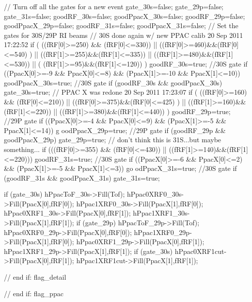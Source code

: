 \begin{DoxyCode}
{{{{{{{{{{          // Turn off all the gates for a new event
          gate_30s=false;
          gate_29p=false;
          gate_31s=false;
          goodRF_30s=false;
          goodPpacX_30s=false;
          goodRF_29p=false;
          goodPpacX_29p=false;
          goodRF_31s=false;
          goodPpacX_31s=false;
          // Set the gates for 30S/29P RI beams
          // 30S done again w/ new PPAC calib 20 Sep 2011 17:22:52  
          if (  ((fRF[0]>=250) && (fRF[0]<=330)) || ((fRF[0]>=460)&&(fRF[0]<=540)
      ) ||
            ((fRF[1]>=255)&&(fRF[1]<=335)) || ((fRF[1]>=480)&&(fRF[1]<=530)) || (
      (fRF[1]>=95)&&(fRF[1]<=120))
            ) {goodRF_30s=true;} //30S gate
          if ((PpacX[0]>=-9 && PpacX[0]<=8) && (PpacX[1]>=-10 && PpacX[1]<=10)) {
      goodPpacX_30s=true;} //30S gate
          if (goodRF_30s && goodPpacX_30s) {gate_30s=true;}
          // PPAC X was redone 20 Sep 2011 17:23:07 
          if (  ((fRF[0]>=160) && (fRF[0]<=210)) || ((fRF[0]>=375)&&(fRF[0]<=425)
      ) ||
            ((fRF[1]>=160)&&(fRF[1]<=220)) || ((fRF[1]>=380)&&(fRF[1]<=440))
             ) {goodRF_29p=true;} //29P gate
          if ((PpacX[0]>=-4 && PpacX[0]<=9) && (PpacX[1]>=-5 && PpacX[1]<=14)) {g
      oodPpacX_29p=true;} //29P gate
          if (goodRF_29p && goodPpacX_29p) {gate_29p=true;}
          // don't think this is 31S...but maybe something...
          if (((fRF[0]>=355) && (fRF[0]<=430)) || ((fRF[1]>=140)&&(fRF[1]<=220)))
       {goodRF_31s=true;} //30S gate
          if ((PpacX[0]>=-6 && PpacX[0]<=2) && (PpacX[1]>=-5 && PpacX[1]<=3)) {go
      odPpacX_31s=true;} //30S gate
          if (goodRF_31s && goodPpacX_31s) {gate_31s=true;}
          
          if (gate_30s) {
            hPpacToF_30s->Fill(Tof);
              hPpac0XRF0_30s->Fill(PpacX[0],fRF[0]);
              hPpac1XRF0_30s->Fill(PpacX[1],fRF[0]);
              hPpac0XRF1_30s->Fill(PpacX[0],fRF[1]);
              hPpac1XRF1_30s->Fill(PpacX[1],fRF[1]);
          }
          if (gate_29p) {
            hPpacToF_29p->Fill(Tof);
              hPpac0XRF0_29p->Fill(PpacX[0],fRF[0]);
              hPpac1XRF0_29p->Fill(PpacX[1],fRF[0]);
              hPpac0XRF1_29p->Fill(PpacX[0],fRF[1]);
              hPpac1XRF1_29p->Fill(PpacX[1],fRF[1]);
          }
          if (gate_30s){
                hPpac0XRF1cut->Fill(PpacX[0],fRF[1]);
                hPpac1XRF1cut->Fill(PpacX[1],fRF[1]);
          }
        } // end if: flag_detail
      } // end if: flag_ppac

}}}}}}}}
\end{DoxyCode}
